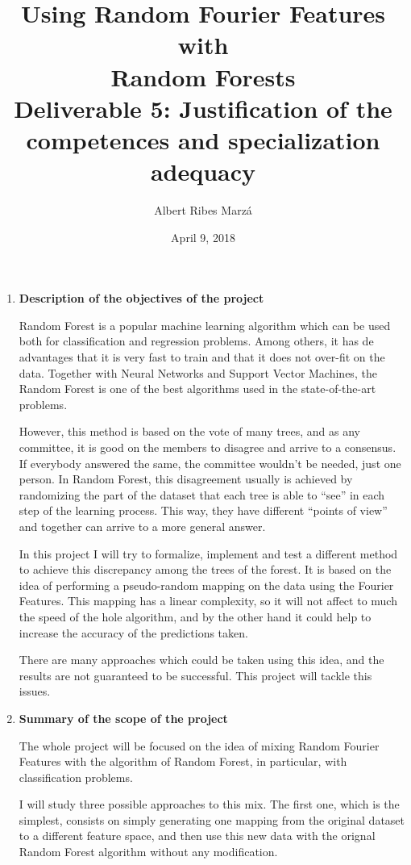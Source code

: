 \documentclass[a4paper]{article}
\title{
Using Random Fourier Features with \\ Random Forests \\
\large Deliverable 5: Justification of the competences and specialization adequacy}
\author{Albert Ribes Marzá}
\date{April 9, 2018}
\begin{document}
    \maketitle
    \pagebreak


    \begin{enumerate}
        \item \textbf{Description of the objectives of the project}

        Random Forest is a popular machine learning algorithm which can be used both for classification and regression problems. Among others, it has de advantages that it is very fast to train and that it does not over-fit on the data. Together with Neural Networks and Support Vector Machines, the Random Forest is one of the best algorithms used in the state-of-the-art problems.

        However, this method is based on the vote of many trees, and as any committee, it is good on the members to disagree and arrive to a consensus. If everybody answered the same, the committee wouldn't be needed, just one person. In Random Forest, this disagreement usually is achieved by randomizing the part of the dataset that each tree is able to ``see'' in each step of the learning process. This way, they have different ``points of view'' and together can arrive to a more general answer.

        In this project I will try to formalize, implement and test a different method to achieve this discrepancy among the trees of the forest. It is based on the idea of performing a pseudo-random mapping on the data using the Fourier Features. This mapping has a linear complexity, so it will not affect to much the speed of the hole algorithm, and by the other hand it could help to increase the accuracy of the predictions taken.

        There are many approaches which could be taken using this idea, and the results are not guaranteed to be successful. This project will tackle this issues.

        \item \textbf{Summary of the scope of the project}

        The whole project will be focused on the idea of mixing Random Fourier Features with the algorithm of Random Forest, in particular, with classification problems.

        I will study three possible approaches to this mix. The first one, which is the simplest, consists on simply generating one mapping from the original dataset to a different feature space, and then use this new data with the orignal Random Forest algorithm without any modification.


\end{enumerate}
\end{document}
